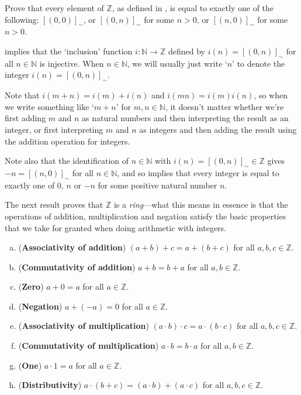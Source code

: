 \begin{exercise}
\label{exRepresentativesOfElementsOfZ}
Prove that every element of $\mathbb{Z}$, as defined in , is equal to exactly one of the following: $[(0,0)]_{\sim}$, or $[(0,n)]_{\sim}$ for some $n>0$, or $[(n,0)]_{\sim}$ for some $n>0$.
\end{exercise}

 implies that the `inclusion' function $i : \mathbb{N} \to \mathbb{Z}$ defined by $i(n) = [(0,n)]_{\sim}$ for all $n \in \mathbb{N}$ is injective. When $n \in \mathbb{N}$, we will usually just write `$n$' to denote the integer $i(n) = [(0,n)]_{\sim}$.

Note that $i(m+n) = i(m)+i(n)$ and $i(mn) = i(m)i(n)$, so when we write something like `$m+n$' for $m,n \in \mathbb{N}$, it doesn't matter whether we're first adding $m$ and $n$ as natural numbers and then interpreting the result as an integer, or first interpreting $m$ and $n$ as integers and then adding the result using the addition operation for integers.

Note also that the identification of $n \in \mathbb{N}$ with $i(n) = [(0,n)]_{\sim} \in \mathbb{Z}$ gives $-n = [(n,0)]_{\sim}$ for all $n \in \mathbb{N}$, and so  implies that every integer is equal to exactly one of $0$, $n$ or $-n$ for some positive natural number $n$.

The next result proves that $\mathbb{Z}$ is a \textit{ring}---what this means in essence is that the operations of addition, multiplication and negation satisfy the basic properties that we take for granted when doing arithmetic with integers.

\begin{theorem}
\label{thmZIsARing}
\fixlistskip%
\begin{enumerate}[(a)]
\item (\textbf{Associativity of addition}) $(a+b)+c = a+(b+c)$ for all $a,b,c \in \mathbb{Z}$.
\item (\textbf{Commutativity of addition}) $a+b=b+a$ for all $a,b \in \mathbb{Z}$.
\item (\textbf{Zero}) $a+0 = a$ for all $a \in \mathbb{Z}$.
\item (\textbf{Negation}) $a + (-a) = 0$ for all $a \in \mathbb{Z}$.
\item (\textbf{Associativity of multiplication}) $(a \cdot b) \cdot c = a \cdot (b \cdot c)$ for all $a,b,c \in \mathbb{Z}$.
\item (\textbf{Commutativity of multiplication}) $a \cdot b = b \cdot a$ for all $a,b \in \mathbb{Z}$.
\item (\textbf{One}) $a \cdot 1 = a$ for all $a \in \mathbb{Z}$.
\item (\textbf{Distributivity}) $a \cdot (b + c) = (a \cdot b) + (a \cdot c)$ for all $a,b,c \in \mathbb{Z}$.
\end{enumerate}
\end{theorem}

